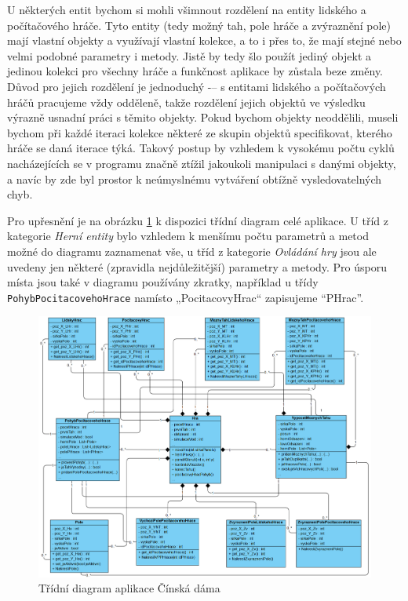 U některých entit bychom si mohli všimnout rozdělení na entity lidského a počítačového hráče. Tyto entity (tedy možný tah, pole hráče a zvýraznění pole) mají vlastní objekty a využívají vlastní kolekce, a to i přes to, že mají stejné nebo velmi podobné parametry i metody. Jistě by tedy šlo použít jediný objekt a jedinou kolekci pro všechny hráče a funkčnost aplikace by zůstala beze změny. Důvod pro jejich rozdělení je jednoduchý -– s entitami lidského a počítačových hráčů pracujeme vždy odděleně, takže rozdělení jejich objektů ve výsledku výrazně usnadní práci s těmito objekty. Pokud bychom objekty neoddělili, museli bychom při každé iteraci kolekce některé ze skupin objektů specifikovat, kterého hráče se daná iterace týká. Takový postup by vzhledem k vysokému počtu cyklů nacházejících se v programu značně ztížil jakoukoli manipulaci s danými objekty, a navíc by zde byl prostor k neúmyslnému vytváření obtížně vysledovatelných chyb.

Pro upřesnění je na obrázku \ref{fig:TridniDiagram} k dispozici třídní diagram celé aplikace. U tříd z kategorie \emph{Herní entity} bylo vzhledem k menšímu počtu parametrů a metod možné do diagramu zaznamenat vše, u tříd z kategorie \emph{Ovládání hry} jsou ale uvedeny jen některé (zpravidla nejdůležitější) parametry a metody. Pro úsporu místa jsou také v diagramu používány zkratky, například u třídy \lstinline$PohybPocitacovehoHrace$ namísto „PocitacovyHrac“ zapisujeme \enquote{PHrac}.

\begin{figure}
	\centering
	\includegraphics[width=1\textwidth]{Figures/TridniDiagram.png}
	\caption{Třídní diagram aplikace Čínská dáma}
    \label{fig:TridniDiagram}
\end{figure}

